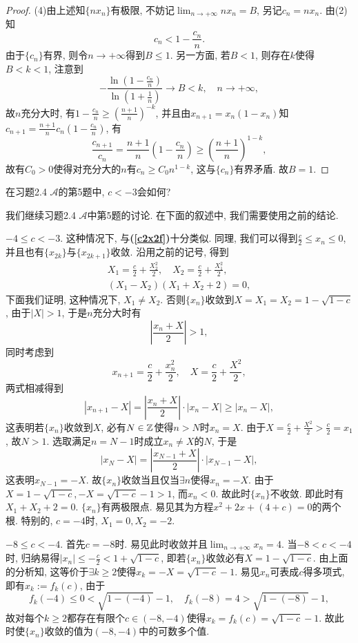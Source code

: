 \begin{quizb}
\begin{proof}
(4)由上述知\(\{nx_n\}\)有极限, 不妨记\(\lim_{n\rightarrow+\infty}nx_n=B\), 另记\(c_n=nx_n\). 由(2)知\[c_n<1-\frac{c_n}{n}.\]由于\(\{c_n\}\)有界, 则令\(n\rightarrow+\infty\)得到\(B\leqslant 1\). 另一方面, 若\(B<1\), 则存在\(k\)使得\(B<k<1\), 注意到\[-\frac{\ln\left(1-\displaystyle\frac{c_n}{n}\right)}{\ln\left(1+\displaystyle\frac{1}{n}\right)}\rightarrow B<k,\quad n\rightarrow+\infty,\]故\(n\)充分大时, 有\(1-\frac{c_n}{n}\geqslant\left(\frac{n+1}{n}\right)^{-k}\), 并且由\(x_{n+1}=x_n(1-x_n)\)知\(c_{n+1}=\frac{n+1}{n}c_n\left(1-\frac{c_n}{n}\right)\), 有\[\frac{c_{n+1}}{c_n}=\frac{n+1}{n}\left(1-\frac{c_n}{n}\right)\geqslant\left(\frac{n+1}{n}\right)^{1-k},\]故有\(C_0>0\)使得对充分大的\(n\)有\(c_n\geqslant C_0n^{1-k}\), 这与\(\{c_n\}\)有界矛盾. 故\(B=1\).
\end{proof}
\woe 在习题2.4 \(\boldsymbol{\mathcal{A}}\)的第5题中, \(c<-3\)会如何? 
\begin{solution}
我们继续习题2.4 \(\boldsymbol{\mathcal{A}}\)中第5题的讨论. 在下面的叙述中, 我们需要使用之前的结论.
\begin{asparaenum}[\bfseries (i)]
\setcounter{enumi}{3}
\item \(-4\leqslant c<-3\). 这种情况下, 与\textbf{(\ref{c2x2f})}十分类似. 同理, 我们可以得到\(\frac{c}{2}\leqslant x_n\leqslant 0\), 并且也有\(\{x_{2k}\}\)与\(\{x_{2k+1}\}\)收敛. 沿用之前的记号, 得到
\begin{gather*}
X_1=\frac{c}{2}+\frac{X_2^2}{2},\quad X_2=\frac{c}{2}+\frac{X_1^2}{2},\\
(X_1-X_2)(X_1+X_2+2)=0,
\end{gather*}
下面我们证明, 这种情况下, \(X_1\ne X_2\). 否则\(\{x_n\}\)收敛到\(X=X_1=X_2=1-\sqrt{1-c}\), 由于\(|X|>1\), 于是\(n\)充分大时有\[\left|\frac{x_n+X}{2}\right|>1,\]同时考虑到\[x_{n+1}=\frac{c}{2}+\frac{x_n^2}{2},\quad X=\frac{c}{2}+\frac{X^2}{2},\]两式相减得到\[\left|x_{n+1}-X\right|=\left|\frac{x_n+X}{2}\right|\cdot\left|x_n-X\right|\geqslant\left|x_n-X\right|,\]这表明若\(\{x_n\}\)收敛到\(X\), 必有\(N\in\mathbb{Z}\)使得\(n>N\)时\(x_n=X\). 由于\(X=\frac{c}{2}+\frac{X^2}{2}>\frac{c}{2}=x_1\), 故\(N>1\). 选取满足\(n=N-1\)时成立\(x_n\ne X\)的\(N\), 于是\[\left|x_N-X\right|=\left|\frac{x_{N-1}+X}{2}\right|\cdot\left|x_{N-1}-X\right|,\]这表明\(x_{N-1}=-X\). 故\(\{x_n\}\)收敛当且仅当\(\exists n\)使得\(x_n=-X\). 由于\(X=1-\sqrt{1-c},-X=\sqrt{1-c}-1>1\), 而\(x_n<0\). 故此时\(\{x_n\}\)不收敛. 即此时有\(X_1+X_2+2=0\). \(\{x_n\}\)有两极限点. 易见其为方程\(x^2+2x+(4+c)=0\)的两个根. 特别的, \(c=-4\)时, \(X_1=0, X_2=-2\).
\item \(-8\leqslant c<-4\). 首先\(c=-8\)时. 易见此时收敛并且\(\lim_{n\rightarrow+\infty}x_n=4\). 当\(-8<c<-4\)时, 归纳易得\(|x_n|\leqslant -\frac{c}{2}<1+\sqrt{1-c}\), 即若\(\{x_n\}\)收敛必有\(X=1-\sqrt{1-c}\). 由上面的分析知, 这等价于\(\exists k\geqslant 2\)使得\(x_k=-X=\sqrt{1-c}-1\). 易见\(x_n\)可表成\(c\)得多项式, 即有\(x_k:=f_k(c)\), 由于\[f_k(-4)\leqslant 0<\sqrt{1-(-4)}-1,\quad f_k(-8)=4>\sqrt{1-(-8)}-1,\]故对每个\(k\geqslant 2\)都存在有限个\(c\in(-8,-4)\)使得\(x_k=f_k(c)=\sqrt{1-c}-1\). 故此时使\(\{x_n\}\)收敛的值为\((-8,-4)\)中的可数多个值.

\end{asparaenum}
\end{solution}
\end{quizb}
